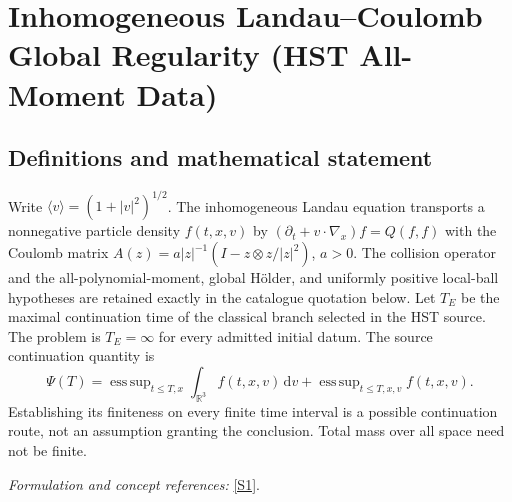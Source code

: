 \documentclass[11pt,a4paper]{article}
\newcommand{\R}{\mathbb{R}}
\newcommand{\dd}{\,\mathrm d}
\newcommand{\sref}[2]{\hyperlink{source:#1:#2}{[S#2]}}
\numberwithin{equation}{section}
\begin{document}
\setcounter{section}{178}
\clearpage
\section{\texorpdfstring{Inhomogeneous Landau–Coulomb Global Regularity (HST All-Moment Data)}{Inhomogeneous Landau–Coulomb Global Regularity (HST All-Moment Data)}}\label{179}
\subsection{Definitions and mathematical statement}
Write $\langle v\rangle=(1+|v|^2)^{1/2}$. The inhomogeneous Landau equation transports a nonnegative particle density $f(t,x,v)$ by
$(\partial_t+v\cdot\nabla_x)f=Q(f,f)$ with the Coulomb matrix
$A(z)=a|z|^{-1}(I-z\otimes z/|z|^2)$, $a>0$. The collision operator and the all-polynomial-moment, global H\"older, and uniformly positive local-ball hypotheses are retained exactly in the catalogue quotation below. Let $T_E$ be the maximal continuation time of the classical branch selected in the HST source. The problem is $T_E=\infty$ for every admitted initial datum. The source continuation quantity is
\[
 \Psi(T)=\mathop{\mathrm{ess\,sup}}_{t\le T,x}\int_{\R^3}f(t,x,v)\dd v
 +\mathop{\mathrm{ess\,sup}}_{t\le T,x,v}f(t,x,v).
\]
Establishing its finiteness on every finite time interval is a possible continuation route, not an assumption granting the conclusion. Total mass over all space need not be finite.
\par\smallskip\textit{Formulation and concept references:} \sref{179}{1}.
\end{document}
